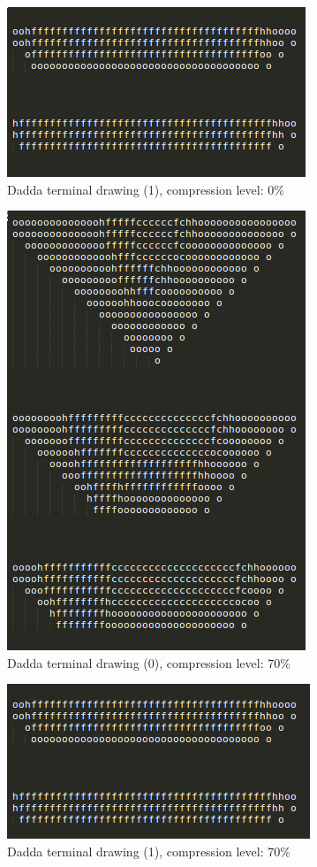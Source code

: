 \documentclass[a4paper]{article}
\begin{document}
	\begin{figure}[hbtp]
	\centering
	\includegraphics[width=0.5\linewidth]{media/dadda1.png}
	\caption{Dadda terminal drawing (1), compression level: 0\%}
	\label{fig:dadda_terminal1}
	\end{figure}

	\begin{figure}[hbtp]
	\centering
	\includegraphics[width=0.5\linewidth]{media/dadda2.png}
	\caption{Dadda terminal drawing (0), compression level: 70\%}
	\label{fig:dadda_terminal2}
	\end{figure}

	\begin{figure}[hbtp]
	\centering
	\includegraphics[width=0.5\linewidth]{media/dadda3.png}
	\caption{Dadda terminal drawing (1), compression level: 70\%}
	\label{fig:dadda_terminal3}
	\end{figure}
\end{document}
